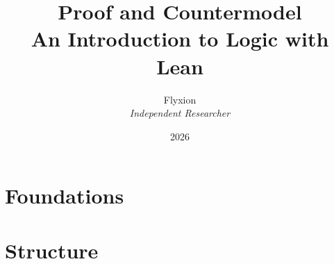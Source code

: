 \documentclass[11pt]{book}
\title{\texorpdfstring{\textbf{Proof and Countermodel}\\[0.3em]
  \large An Introduction to Logic with Lean}%
  {Proof and Countermodel: An Introduction to Logic with Lean}}
\author{Flyxion\\\textit{Independent Researcher}}
\date{2026}
\theoremstyle{definition}
\begin{document}
\frontmatter
\maketitle

\tableofcontents

\mainmatter

\part{Foundations}





\part{Structure}



\backmatter

\end{document}
